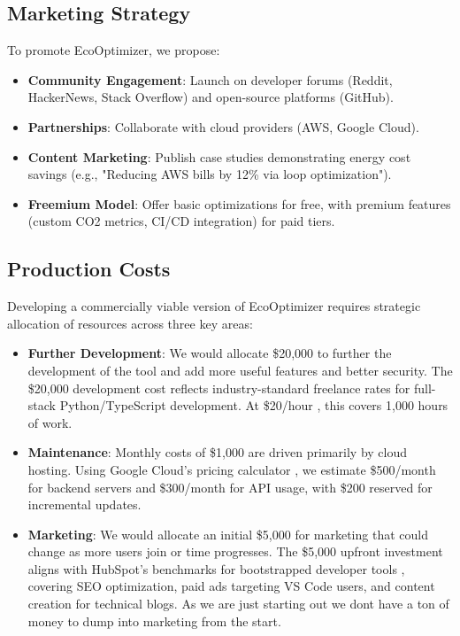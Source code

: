 \documentclass{article}
\begin{document}
\subsection{Marketing Strategy}
To promote EcoOptimizer, we propose:
\begin{itemize}
    \item \textbf{Community Engagement}: Launch on developer forums (Reddit, HackerNews, Stack Overflow) and open-source platforms (GitHub).
    \item \textbf{Partnerships}: Collaborate with cloud providers (AWS, Google Cloud).
    \item \textbf{Content Marketing}: Publish case studies demonstrating energy cost savings (e.g., "Reducing AWS bills by 12\% via loop optimization").
    \item \textbf{Freemium Model}: Offer basic optimizations for free, with premium features (custom CO2 metrics, CI/CD integration) for paid tiers.
\end{itemize}

\subsection{Production Costs}  
Developing a commercially viable version of EcoOptimizer requires strategic allocation of resources across three key areas:  

\begin{itemize}  
    \item \textbf{Further Development}: We would allocate \$20,000 to further the development 
    of the tool and add more useful features and better security. The \$20,000 development 
    cost reflects industry-standard freelance rates for full-stack Python/TypeScript 
    development. At \$20/hour \cite{upwork2025rates}, this covers 1,000 hours of work.

    \item \textbf{Maintenance}: Monthly costs of \$1,000 are driven primarily by cloud 
    hosting. Using Google Cloud’s pricing calculator \cite{googlecloud2025pricing}, 
    we estimate \$500/month for backend servers and \$300/month for API usage, with 
    \$200 reserved for incremental updates.  

    \item \textbf{Marketing}: We would allocate an initial \$5,000 for marketing 
    that could change as more users join or time progresses.
     The \$5,000 upfront investment aligns with HubSpot’s 
    benchmarks for bootstrapped developer tools \cite{hubspot2025marketing}, 
    covering SEO optimization, paid ads targeting VS Code users, and content 
    creation for technical blogs. As we are just starting out we dont have 
    a ton of money to dump into marketing from the start.

\end{itemize}  
\end{document}
